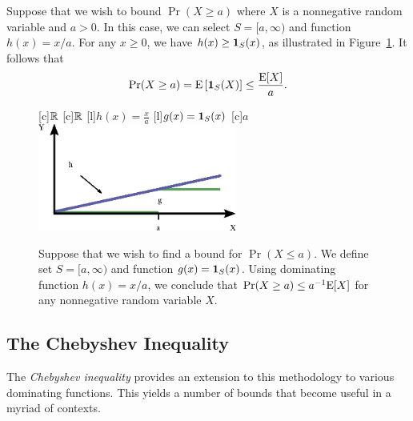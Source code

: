 Suppose that we wish to bound $\Pr (X \geq a)$ where $X$ is a nonnegative random variable and $a > 0$.
In this case, we can select $S = [a, \infty)$ and function $h(x) = x/a$.
For any $x \geq 0$, we have $h(x) \geq \mathbf{1}_S(x)$, as illustrated in Figure~\ref{figure:MarkovInequality}.
It follows that
\begin{equation*}
\Pr (X \geq a) = \mathrm{E} \left[ \mathbf{1}_S(X) \right] \leq \frac{\mathrm{E} [X]}{a} .
\end{equation*}

\begin{figure}[thb]
\begin{center}
\begin{psfrags}
[c]{$\mathbb{R}$}
[c]{$\mathbb{R}$}
[l]{$h(x) = \frac{x}{a}$}
[l]{$g(x) = \mathbf{1}_S (x)$}
[c]{$a$}
\includegraphics[width=6.5cm]{Figures/10Chapter/Markov}
\end{psfrags}
\caption{Suppose that we wish to find a bound for $\Pr (X \leq a)$.
We define set $S = [a, \infty)$ and function $g(x) = \mathbf{1}_S (x)$.
Using dominating function $h(x) = x/a$, we conclude that $\Pr(X \geq a) \leq a^{-1} \mathrm{E} [X]$ for any nonnegative random variable $X$.}
\label{figure:MarkovInequality}
\end{center}
\end{figure}


\subsection{The Chebyshev Inequality}

The \emph{Chebyshev inequality} provides an extension to this methodology to various dominating functions. 
This yields a number of bounds that become useful in a myriad of contexts.

